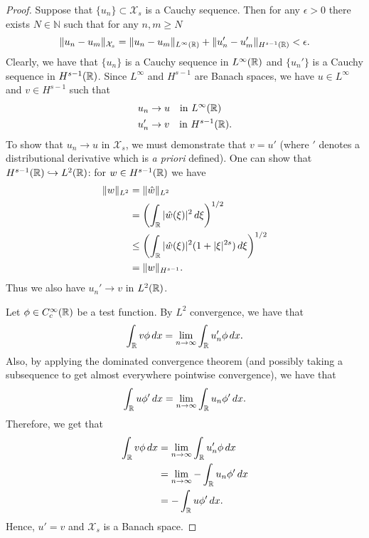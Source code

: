 \begin{proof}
	Suppose that \(\{u_n\}\subset \mathcal X_s\) is a Cauchy sequence. Then for any \(\epsilon > 0\) there exists \(N\in\mathbb N\) such that for any \(n,m\geq N\)
	\begin{equation}
		\| u_n - u_m \|_{\mathcal X_s} = \|u_n - u_m\|_{L^\infty(\mathbb{R})} + \|u_n'-u_m'\|_{H^{s-1}(\mathbb{R})} < \epsilon.
	\end{equation}
	Clearly, we have that \(\{u_n\}\) is a Cauchy sequence in \(L^\infty(\mathbb{R})\) and \(\{u_n'\}\) is a Cauchy sequence in \(H^{s-1}(\mathbb{R})\). Since \(L^\infty\) and \(H^{s-1}\) are Banach spaces, we have \(u \in L^\infty\) and \(v \in H^{s-1}\) such that 
	\begin{equation}
		\begin{aligned}
			u_n &\rightarrow u \quad \text{in } L^\infty(\mathbb{R}) \\
			u_n' &\rightarrow v \quad \text{in } H^{s-1}(\mathbb{R}).
		\end{aligned}
	\end{equation}
	To show that \(u_n \to u\) in \(\mathcal X_s\), we must demonstrate that \(v = u'\) (where \('\) denotes a distributional derivative which is \emph{a priori} defined). One can show that \(H^{s-1}(\mathbb{R}) \hookrightarrow L^2(\mathbb{R})\): for \(w \in H^{s-1}(\mathbb{R})\) we have
	\begin{equation}
	\begin{aligned}
		\|w \|_{L^2} &= \| \hat w \|_{L^2} \\
		&= \left( \int_{\mathbb{R}} |\hat w(\xi)|^2 \, d \xi \right)^{1/2} \\
		&\leq \left( \int_{\mathbb{R}} |\hat w(\xi)|^2 ( 1+ |\xi|^{2s})\, d \xi \right)^{1/2} \\
		&= \| w\|_{H^{s-1}}.
	\end{aligned}
	\end{equation}
	Thus we also have \(u_n' \to v\) in \(L^2(\mathbb{R})\).
	
	Let \(\phi \in C_c^\infty(\mathbb{R})\) be a test function. By \(L^2\) convergence, we have that 
	\begin{equation}
		\int_{\mathbb{R}} v \phi \, dx = \lim_{n\to\infty} \int_{\mathbb{R}} u_n' \phi \, dx.
	\end{equation}
	Also, by applying the dominated convergence theorem (and possibly taking a subsequence to get almost everywhere pointwise convergence), we have that
	\begin{equation}
		\int_{\mathbb{R}} u \phi' \, dx = \lim_{n\to\infty} \int_{\mathbb{R}} u_n \phi' \, dx.
	\end{equation}
	Therefore, we get that 
	\begin{equation}
	\begin{aligned}
		\int_{\mathbb{R}} v \phi \, dx &= \lim_{n\to\infty} \int_{\mathbb{R}} u_n' \phi \, dx \\
		&= \lim_{n\to\infty} - \int_{\mathbb{R}} u_n \phi' \, dx \\
		&= -\int_{\mathbb{R}} u\phi'\, dx .
	\end{aligned}
	\end{equation}
	Hence, \(u' = v\) and \(\mathcal X_s\) is a Banach space.
\end{proof}

